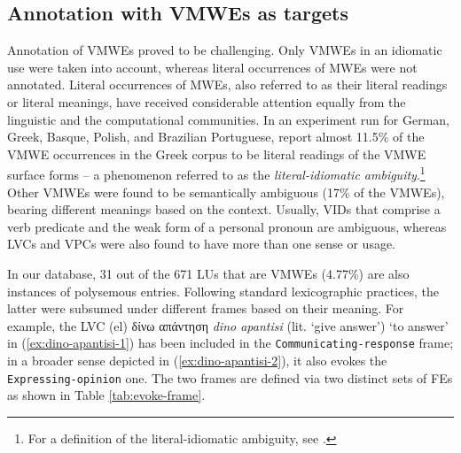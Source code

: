 \documentclass[output=paper,colorlinks,citecolor=brown]{langscibook}
\begin{document}
\subsection{Annotation with VMWEs as targets}

Annotation of VMWEs proved to be challenging. Only VMWEs in an idiomatic use were taken into account, whereas literal occurrences of MWEs were not annotated. Literal occurrences of MWEs, also referred to as their literal readings or literal meanings, have received considerable attention equally from the linguistic and the computational communities. In an experiment run for German, Greek, Basque, Polish, and Brazilian Portuguese, \citet{savary_etal_2019} report almost 11.5\% of the VMWE occurrences in the Greek corpus to be literal readings of the VMWE surface forms -- a phenomenon referred to as the \textit{literal-idiomatic ambiguity}.\footnote{For a definition of the literal-idiomatic ambiguity, see \citep{savary_etal_2019}.} Other VMWEs were found to be semantically ambiguous (17\% of the VMWEs), bearing different meanings based on the context. Usually, VIDs that comprise a verb predicate and the weak form of a personal pronoun are ambiguous, whereas LVCs and VPCs were also found to have more than one sense or usage.

In our database, 31 out of the 671 LUs that are VMWEs (4.77\%) are also instances of polysemous entries. Following standard lexicographic practices, the latter were subsumed under different frames based on their meaning. For example, the LVC (el) {{δίνω απάντηση}} \textit{dino apantisi} (lit. `give answer') `to answer' in (\ref{ex:dino-apantisi-1}) has been included in the \texttt{Communicating-response} frame; in a broader sense depicted in (\ref{ex:dino-apantisi-2}), it also evokes the \texttt{Expressing-opinion} one. The two frames are defined via two distinct sets of FEs as shown in Table \ref{tab:evoke-frame}.
\end{document}
